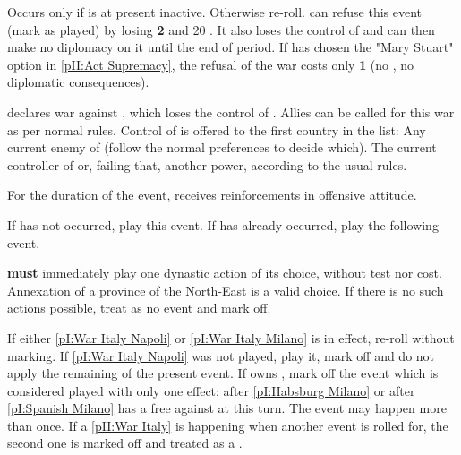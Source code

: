 

\condition{}
\aparag Occurs only if \paysecosse is at present inactive. Otherwise re-roll.
\aparag \ENG can refuse this event (mark as played) by losing {\bf 2} \STAB
and 20 \VP. It also loses the control of \paysecosse and can then make no
diplomacy on it until the end of period.
\bparag If \ANG has chosen the "Mary Stuart" option in \ref{pII:Act
  Supremacy}, the refusal of the war costs only {\bf 1} \STAB (no \VP, no
diplomatic consequences).

\phevnt
\aparag \paysecosse declares war against \ENG, which loses the control of
\paysecosse.
\aparag Allies can be called for this war as per normal rules.
\aparag Control of \paysecosse is offered to the first country in the list:
\bparag Any current enemy of \ENG (follow the normal preferences to decide
which).
\bparag The current controller of \paysecosse or, failing that, another power,
according to the usual rules.

\phadm
\aparag For the duration of the event, \paysecosse receives reinforcements in
offensive attitude.




\aparag If  has not occurred, play this event.
\aparag If  has already occurred, play the
following event.




\phevnt
\aparag \SPA \textbf{must} immediately play one dynastic action of its choice,
without test nor cost. Annexation of a province of the North-East is a valid
choice. If there is no such actions possible, treat as no event and mark off.





\aparag If either \ref{pI:War Italy Napoli} or \ref{pI:War Italy Milano} is in
effect, re-roll without marking.
\aparag If \ref{pI:War Italy Napoli} was not played, play it, mark off and do
not apply the remaining of the present event.
\aparag If \FRA owns \provinceLombardia, mark off the event which is
considered played with only one effect: \HAB after \ref{pI:Habsburg Milano} or
\SPA after \ref{pI:Spanish Milano} has a free \CB against \FRA at this turn.
\aparag The event may happen more than once. If a \ref{pII:War Italy} is
happening when another event is rolled for, the second one is marked off and
treated as a \RD.

